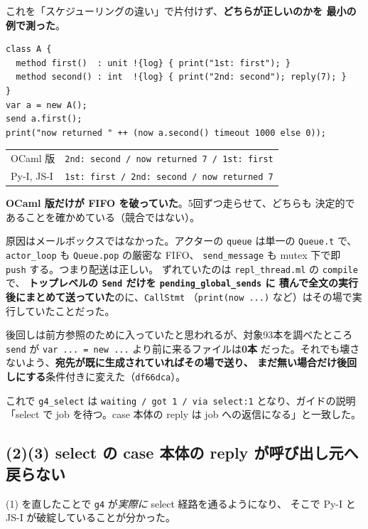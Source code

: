 \documentclass[11pt,a4paper]{ltjsarticle}
\begin{document}
これを「スケジューリングの違い」で片付けず、\textbf{どちらが正しいのかを
最小の例で測った}。

\begin{lstlisting}[language=AIPL]
class A {
  method first()  : unit !{log} { print("1st: first"); }
  method second() : int  !{log} { print("2nd: second"); reply(7); }
}
var a = new A();
send a.first();
print("now returned " ++ (now a.second() timeout 1000 else 0));
\end{lstlisting}

\begin{center}
\small
\begin{tabular}{@{}ll@{}}
\toprule
OCaml 版 & \texttt{2nd: second / now returned 7 / 1st: first} \\
Py-I, JS-I & \texttt{1st: first / 2nd: second / now returned 7} \\
\bottomrule
\end{tabular}
\end{center}

\textbf{OCaml 版だけが FIFO を破っていた}。5回ずつ走らせて、どちらも
決定的であることを確かめている（競合ではない）。

原因はメールボックスではなかった。アクターの \texttt{queue} は単一の
\texttt{Queue.t} で、\texttt{actor\_loop} も \texttt{Queue.pop} の厳密な FIFO、
\texttt{send\_message} も mutex 下で即 \texttt{push} する。つまり配送は正しい。
ずれていたのは \texttt{repl\_thread.ml} の \texttt{compile} で、
\textbf{トップレベルの \texttt{Send} だけを \texttt{pending\_global\_sends} に
積んで全文の実行後にまとめて送っていた}のに、\texttt{CallStmt}
（\texttt{print(now ...)} など）はその場で実行していたことだった。

後回しは前方参照のために入っていたと思われるが、対象93本を調べたところ
\texttt{send} が \texttt{var ... = new ...} より前に来るファイルは\textbf{0本}
だった。それでも壊さないよう、\textbf{宛先が既に生成されていればその場で送り、
まだ無い場合だけ後回しにする}条件付きに変えた（\texttt{df66dca}）。

これで \texttt{g4\_select} は
\texttt{waiting / got 1 / via select:1} となり、ガイドの説明
「select で job を待つ。case 本体の reply は job への返信になる」と一致した。

\subsection{(2)(3) select の case 本体の reply が呼び出し元へ戻らない}

(1) を直したことで \texttt{g4} が\emph{実際に} select 経路を通るようになり、
そこで Py-I と JS-I が破綻していることが分かった。
\end{document}
